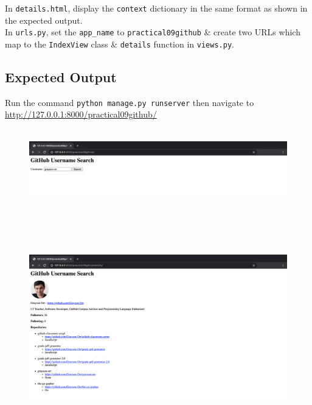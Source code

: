 \documentclass{article}
\begin{document}
In \texttt{details.html}, display the \texttt{context} dictionary in the same format as shown in the expected output.\\

In \texttt{urls.py}, set the \texttt{app\_name} to \texttt{practical09github} \& create two URLs which map to the \texttt{IndexView} class \& \texttt{details} function in \texttt{views.py}.

\subsection*{Expected Output} 
Run the command \texttt{python manage.py runserver} then navigate to \href{http://127.0.0.1:8000/practical09github/}{http://127.0.0.1:8000/practical09github/} \\

\begin{figure}[H]
  \includegraphics[width=175mm, height=35mm]{./img/09-expected-github-2.png}
  \includegraphics[width=175mm, height=100mm]{./img/09-expected-github-3.png}
\end{figure}
\end{document}
